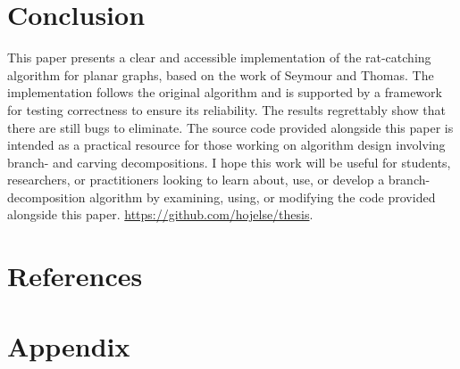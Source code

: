 \documentclass{article}
\begin{document}
\section{Conclusion}
	This paper presents a clear and accessible implementation of the rat-catching algorithm for planar graphs, based on the work of Seymour and Thomas. The implementation follows the original algorithm and is supported by a framework for testing correctness to ensure its reliability. The results regrettably show that there are still bugs to eliminate. The source code provided alongside this paper is intended as a practical resource for those working on algorithm design involving branch- and carving decompositions. I hope this work will be useful for students, researchers, or practitioners looking to learn about, use, or develop a branch-decomposition algorithm by examining, using, or modifying the code provided alongside this paper. \url{https://github.com/hojelse/thesis}.

\newpage
\section{References}
	\printbibliography

\newpage
\section{Appendix}
	\subsection{}
	\label{branch_decomposition.py}
	\subsection{}
	\label{branch_width.py}
	\subsection{}
	\label{carving_decomposition.py}
	\subsection{}
	\label{carving_width.py}
	\subsection{}
	\label{contraction.py}
\end{document}
